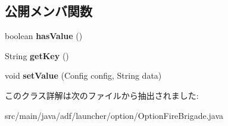 \subsection*{公開メンバ関数}
\begin{DoxyCompactItemize}
\item 
\hypertarget{classadf_1_1launcher_1_1option_1_1OptionFireBrigade_aa82570affa16a50701642d994ae8119a}{}\label{classadf_1_1launcher_1_1option_1_1OptionFireBrigade_aa82570affa16a50701642d994ae8119a} 
boolean {\bfseries has\+Value} ()
\item 
\hypertarget{classadf_1_1launcher_1_1option_1_1OptionFireBrigade_acbc174554f49eefcb346550a9f986c81}{}\label{classadf_1_1launcher_1_1option_1_1OptionFireBrigade_acbc174554f49eefcb346550a9f986c81} 
String {\bfseries get\+Key} ()
\item 
\hypertarget{classadf_1_1launcher_1_1option_1_1OptionFireBrigade_a91bf1bef4817bd7db392c27d2ae6af4d}{}\label{classadf_1_1launcher_1_1option_1_1OptionFireBrigade_a91bf1bef4817bd7db392c27d2ae6af4d} 
void {\bfseries set\+Value} (Config config, String data)
\end{DoxyCompactItemize}


このクラス詳解は次のファイルから抽出されました\+:\begin{DoxyCompactItemize}
\item 
src/main/java/adf/launcher/option/Option\+Fire\+Brigade.\+java\end{DoxyCompactItemize}
